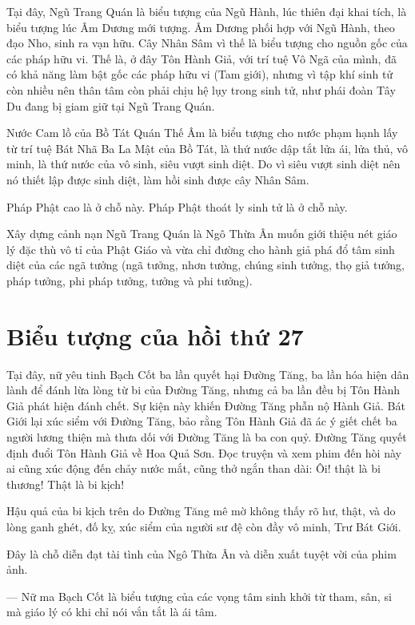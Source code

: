 Tại đây, Ngũ Trang Quán là biểu tượng của Ngũ Hành, lúc thiên đại khai tích, là biểu tượng lúc Âm Dương mới tượng. Âm Dương phối hợp với Ngũ Hành, theo đạo Nho, sinh ra vạn hữu. Cây Nhân Sâm vì thế là biểu tượng cho nguồn gốc của các pháp hữu vi. Thế là, ở đây Tôn Hành Giả, với trí tuệ Vô Ngã của mình, đã có khả năng làm bật gốc các pháp hữu vi (Tam giới), nhưng vì tập khí sinh tử còn nhiều nên thân tâm còn phải chịu hệ lụy trong sinh tử, như phái đoàn Tây Du đang bị giam giữ tại Ngũ Trang Quán.

Nước Cam lồ của Bồ Tát Quán Thế Âm là biểu tượng cho nước phạm hạnh lấy từ trí tuệ Bát Nhã Ba La Mật của Bồ Tát, là thứ nước dập tắt lửa ái, lửa thủ, vô minh, là thứ nước của vô sinh, siêu vượt sinh diệt. Do vì siêu vượt sinh diệt nên nó thiết lập được sinh diệt, làm hồi sinh được cây Nhân Sâm.

Pháp Phật cao là ở chỗ này. Pháp Phật thoát ly sinh tử là ở chỗ này.

Xây dựng cảnh nạn Ngũ Trang Quán là Ngô Thừa Ân muốn giới thiệu nét giáo lý đặc thù vô tỉ của Phật Giáo và vừa chỉ đường cho hành giả phá đổ tâm sinh diệt của các ngã tưởng (ngã tưởng, nhơn tưởng, chúng sinh tưởng, thọ giả tưởng, pháp tưởng, phi pháp tưởng, tưởng và phi tưởng).

\section{Biểu tượng của hồi thứ 27} %
\label{sec:bieu_tuong_cua_hoi_thu_27}

Tại đây, nữ yêu tinh Bạch Cốt ba lần quyết hại Đường Tăng, ba lần hóa hiện dân lành để đánh lừa lòng từ bi của Đường Tăng, nhưng cả ba lần đều bị Tôn Hành Giả phát hiện đánh chết. Sự kiện này khiến Đường Tăng phẫn nộ Hành Giả. Bát Giới lại xúc siểm với Đường Tăng, bảo rằng Tôn Hành Giả đã ác ý giết chết ba người lương thiện mà thưa dối với Đường Tăng là ba con quỷ. Đường Tăng quyết định đuổi Tôn Hành Giả về Hoa Quả Sơn. Đọc truyện và xem phim đến hòi này ai cũng xúc động đến chảy nước mắt, cũng thở ngắn than dài: Ôi! thật là bi thương! Thật là bi kịch!

Hậu quả của bi kịch trên do Đường Tăng mê mờ không thấy rõ hư, thật, và do lòng ganh ghét, đố kỵ, xúc siểm của người sư đệ còn đầy vô minh, Trư Bát Giới.

Đây là chỗ diễn đạt tài tình của Ngô Thừa Ân và diễn xuất tuyệt vời của phim ảnh.

— Nữ ma Bạch Cốt là biểu tượng của các vọng tâm sinh khởi từ tham, sân, si mà giáo lý có khi chỉ nói vắn tắt là ái tâm.

